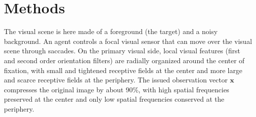 \section{Methods}


\CNS

The visual scene is here made of a foreground (the target) and a noisy background. An agent controls a focal visual sensor that can move over the visual scene through saccades. 
On the primary visual side, local visual features (first and second order orientation filters) are radially organized around the center of fixation, with small and tightened receptive fields at the center and more large and scarce receptive fields at the periphery. The issued observation vector $\boldsymbol{x}$ compresses the original image by about 90\%, with high spatial frequencies preserved at the center and only low spatial frequencies conserved at the periphery. 
\fi

